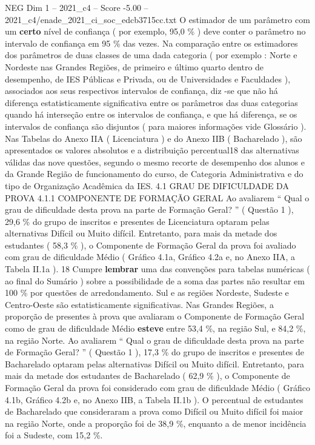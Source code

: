 \begin{textsample}{NEG Dim 1 – 2021\_c4 – Score -5.00 – 2021\_c4/enade\_2021\_ci\_soc\_edcb3715cc.txt}
O estimador de um parâmetro com um \textbf{certo} nível de confiança ( por exemplo, 95,0 \% ) deve conter o parâmetro no intervalo de confiança em 95 \% das vezes.
Na comparação entre os estimadores dos parâmetros de duas classes de uma dada categoria ( por exemplo : Norte e Nordeste nas Grandes Regiões, de primeiro e último quarto dentro de desempenho, de IES Públicas e Privada, ou de Universidades e Faculdades ), associados aos seus respectivos intervalos de confiança, diz -se que não há diferença estatisticamente significativa entre os parâmetros das duas categorias quando há interseção entre os intervalos de confiança, e que há diferença, se os intervalos de confiança são disjuntos ( para maiores informações vide Glossário ).
Nas Tabelas do Anexo IIA ( Licenciatura ) e do Anexo IIB ( Bacharelado ), são apresentados os valores absolutos e a distribuição percentual18 das alternativas válidas das nove questões, segundo o mesmo recorte de desempenho dos alunos e da Grande Região de funcionamento do curso, de Categoria Administrativa e do tipo de Organização Acadêmica da IES. 4.1 GRAU DE DIFICULDADE DA PROVA 4.1.1 COMPONENTE DE FORMAÇÃO GERAL Ao avaliarem “ Qual o grau de dificuldade desta prova na parte de Formação Geral? ” ( Questão 1 ), 29,6 \% do grupo de inscritos e presentes de Licenciatura optaram pelas alternativas Difícil ou Muito difícil.
Entretanto, para mais da metade dos estudantes ( 58,3 \% ), o Componente de Formação Geral da prova foi avaliado com grau de dificuldade Médio ( Gráfico 4.1a, Gráfico 4.2a e, no Anexo IIA, a Tabela II.1a ). 18 Cumpre \textbf{lembrar} uma das convenções para tabelas numéricas ( ao final do Sumário ) sobre a possibilidade de a soma das partes não resultar em 100 \% por questões de arredondamento.
Sul e as regiões Nordeste, Sudeste e Centro-Oeste são estatisticamente significativas.
Nas Grandes Regiões, a proporção de presentes à prova que avaliaram o Componente de Formação Geral como de grau de dificuldade Médio \textbf{esteve} entre 53,4 \%, na região Sul, e 84,2 \%, na região Norte.
Ao avaliarem “ Qual o grau de dificuldade desta prova na parte de Formação Geral? ” ( Questão 1 ), 17,3 \% do grupo de inscritos e presentes de Bacharelado optaram pelas alternativas Difícil ou Muito difícil.
Entretanto, para mais da metade dos estudantes de Bacharelado ( 62,9 \% ), o Componente de Formação Geral da prova foi considerado com grau de dificuldade Médio ( Gráfico 4.1b, Gráfico 4.2b e, no Anexo IIB, a Tabela II.1b ).
O percentual de estudantes de Bacharelado que consideraram a prova como Difícil ou Muito difícil foi maior na região Norte, onde a proporção foi de 38,9 \%, enquanto a de menor incidência foi a Sudeste, com 15,2 \%.

\end{textsample}
